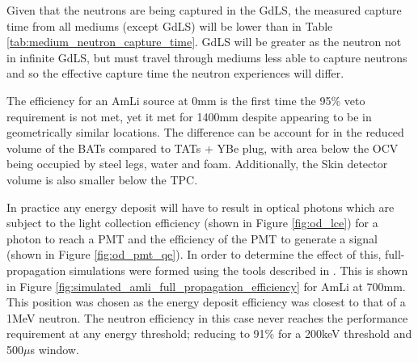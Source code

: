 Given that the neutrons are being captured in the GdLS, the measured capture time from all mediums (except GdLS) will be lower than in Table \ref{tab:medium_neutron_capture_time}. 
GdLS will be greater as the neutron not in infinite GdLS, but must travel through mediums less able to capture neutrons and so the effective capture time the neutron experiences will differ.

\par
The efficiency for an AmLi source at 0mm is the first time the 95\% veto requirement is not met, yet it met for 1400mm despite appearing to be in geometrically similar locations.
The difference can be account for in the reduced volume of the BATs compared to TATs + YBe plug, with area below the OCV being occupied by steel legs, water and foam.
Additionally, the Skin detector volume is also smaller below the TPC.






\par
In practice any energy deposit will have to result in optical photons which are subject to the light collection efficiency (shown in Figure \ref{fig:od_lce}) for a photon to reach a PMT and the efficiency of the PMT to generate a signal (shown in Figure \ref{fig:od_pmt_qe}).
In order to determine the effect of this, full-propagation simulations were formed using the tools described in \cite{lz_simulations_ref}.
This is shown in Figure \ref{fig:simulated_amli_full_propagation_efficiency} for AmLi at 700mm. 
This position was chosen as the energy deposit efficiency was closest to that of a 1MeV neutron.
The neutron efficiency in this case never reaches the performance requirement at any energy threshold; reducing to 91\% for a 200keV threshold and 500$\mu$s window.

